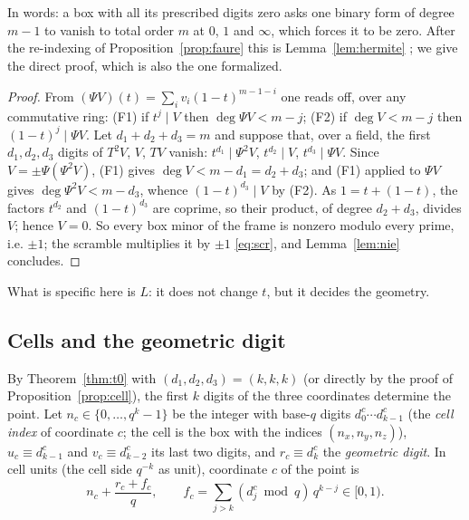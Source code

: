 \documentclass[11pt]{amsart}
\theoremstyle{definition}
\theoremstyle{plain}
\begin{document}
In words: a box with all its prescribed digits zero asks one binary form of degree $m-1$ to vanish to total order $m$ at $0$, $1$ and $\infty$, which forces it to be zero. After the re-indexing of Proposition~\ref{prop:faure} this is Lemma~\ref{lem:hermite} \cite[Thm.~6.2]{Nie87}; we give the direct proof, which is also the one formalized.

\begin{proof}
From $(\Psi V)(t)=\sum_iv_i(1-t)^{m-1-i}$ one reads off, over any commutative ring:
(F1) if $t^j\mid V$ then $\deg\Psi V<m-j$; (F2) if $\deg V<m-j$ then $(1-t)^j\mid\Psi V$.
Let $d_1+d_2+d_3=m$ and suppose that, over a field, the first $d_1,d_2,d_3$ digits of $T^2V$, $V$, $TV$ vanish: $t^{d_1}\mid\Psi^2V$, $t^{d_2}\mid V$, $t^{d_3}\mid\Psi V$. Since $V=\pm\Psi(\Psi^2V)$, (F1) gives $\deg V<m-d_1=d_2+d_3$; and (F1) applied to $\Psi V$ gives $\deg\Psi^2V<m-d_3$, whence $(1-t)^{d_3}\mid V$ by (F2). As $1=t+(1-t)$, the factors $t^{d_2}$ and $(1-t)^{d_3}$ are coprime, so their product, of degree $d_2+d_3$, divides $V$; hence $V=0$. So every box minor of the frame is nonzero modulo every prime, i.e. $\pm1$; the scramble multiplies it by $\pm1$ \eqref{eq:scr}, and Lemma~\ref{lem:nie} concludes.
\end{proof}

What is specific here is $L$: it does not change $t$, but it decides the geometry.

\subsection{Cells and the geometric digit}\label{sec:sep}
By Theorem~\ref{thm:t0} with $(d_1,d_2,d_3)=(k,k,k)$ (or directly by the proof of Proposition~\ref{prop:cell}), the first $k$ digits of the three coordinates determine the point. Let $n_c\in\{0,\dots,q^k-1\}$ be the integer with base-$q$ digits $d^c_0\cdots d^c_{k-1}$ (the \emph{cell index} of coordinate $c$; the cell is the box with the indices $(n_x,n_y,n_z)$), $u_c\equiv d^c_{k-1}$ and $v_c\equiv d^c_{k-2}$ its last two digits, and $r_c\equiv d^c_k$ the \emph{geometric digit}. In cell units (the cell side $q^{-k}$ as unit), coordinate $c$ of the point is
\[
n_c+\frac{r_c+f_c}{q},\qquad f_c=\textstyle\sum_{j>k}(d^c_j\bmod q)\,q^{k-j}\in[0,1).
\]
\end{document}
